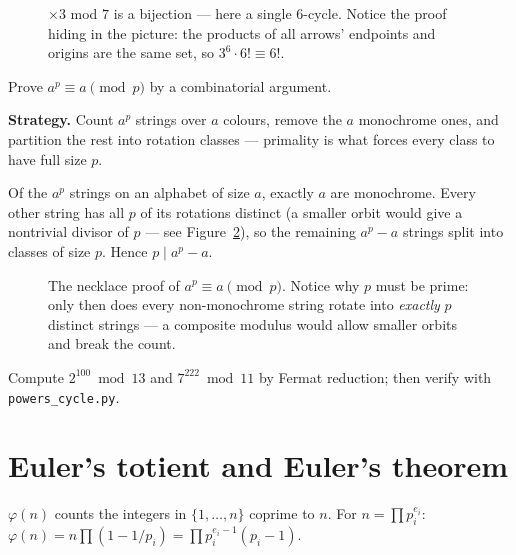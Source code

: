 \begin{figure}[ht]\centering

\caption{$\times 3$ mod $7$ is a bijection --- here a single 6-cycle.
Notice the proof hiding in the picture: the products of all arrows'
endpoints and origins are the same set, so $3^6 \cdot 6! \equiv 6!$.}
\label{fig:perm}
\end{figure}

\begin{example}
Prove $a^p \equiv a \pmod p$ by a combinatorial argument.
\par\smallskip
\textbf{Strategy.} Count $a^p$ strings over $a$ colours, remove the $a$
monochrome ones, and partition the rest into rotation classes ---
primality is what forces every class to have full size $p$.
\par\smallskip
\begin{solution}
Of the $a^p$ strings on an alphabet of size $a$, exactly $a$ are
monochrome. Every other string has all $p$ of its rotations distinct
(a smaller orbit would give a nontrivial divisor of $p$ --- see
Figure~\ref{fig:necklace}), so the remaining $a^p - a$ strings split
into classes of size $p$. Hence $p \mid a^p - a$.
\end{solution}
\end{example}

\begin{figure}[ht]\centering

\caption{The necklace proof of $a^p \equiv a \pmod p$. Notice why $p$
must be prime: only then does every non-monochrome string rotate into
\emph{exactly} $p$ distinct strings --- a composite modulus would allow
smaller orbits and break the count.}
\label{fig:necklace}
\end{figure}

\begin{exercise}[medium]\label{exr:flt}
Compute $2^{100} \bmod 13$ and $7^{222} \bmod{11}$ by Fermat reduction;
then verify with \texttt{powers\_cycle.py}.
\end{exercise}

\section{Euler's totient and Euler's theorem}\label{sec:euler}

\begin{definition}
$\varphi(n)$ counts the integers in $\{1, \dots, n\}$ coprime to $n$.
For $n = \prod p_i^{e_i}$: $\varphi(n) = n \prod (1 - 1/p_i) =
\prod p_i^{e_i-1}(p_i - 1)$.
\end{definition}

